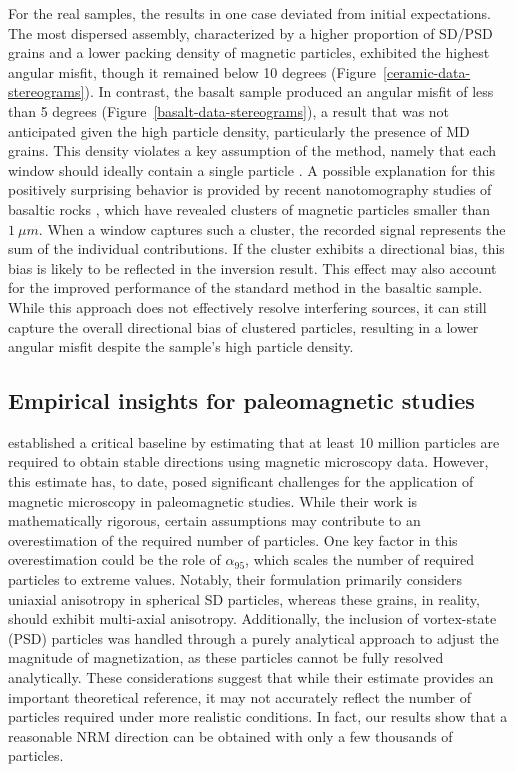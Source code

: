 For the real samples, the results in one case deviated from initial expectations. The most dispersed assembly, characterized by a higher proportion of SD/PSD grains and a lower packing density of magnetic particles, exhibited the highest angular misfit, though it remained below 10 degrees (Figure~\ref{ceramic-data-stereograms}). In contrast, the basalt sample produced an angular misfit of less than 5 degrees (Figure~\ref{basalt-data-stereograms}), a result that was not anticipated given the high particle density, particularly the presence of MD grains. This density violates a key assumption of the method, namely that each window should ideally contain a single particle \citep{Souza-Junior2024}. A possible explanation for this positively surprising behavior is provided by recent nanotomography studies of basaltic rocks \citep[\textit{e.g.}][]{Out2024, Out2025}, which have revealed clusters of magnetic particles smaller than \(1~\mu m\). When a window captures such a cluster, the recorded signal represents the sum of the individual contributions. If the cluster exhibits a directional bias, this bias is likely to be reflected in the inversion result. This effect may also account for the improved performance of the standard method in the basaltic sample. While this approach does not effectively resolve interfering sources, it can still capture the overall directional bias of clustered particles, resulting in a lower angular misfit despite the sample’s high particle density.


\subsection{Empirical insights for paleomagnetic studies}

\citet{Berndt2016} established a critical baseline by estimating that at least 10 million particles are required to obtain stable directions using magnetic microscopy data. However, this estimate has, to date, posed significant challenges for the application of magnetic microscopy in paleomagnetic studies. While their work is mathematically rigorous, certain assumptions may contribute to an overestimation of the required number of particles. One key factor in this overestimation could be the role of \textit{$\alpha_{95}$}, which scales the number of required particles to extreme values. Notably, their formulation primarily considers uniaxial anisotropy in spherical SD particles, whereas these grains, in reality, should exhibit multi-axial anisotropy. Additionally, the inclusion of vortex-state (PSD) particles was handled through a purely analytical approach to adjust the magnitude of magnetization, as these particles cannot be fully resolved analytically. These considerations suggest that while their estimate provides an important theoretical reference, it may not accurately reflect the number of particles required under more realistic conditions.
In fact, our results show that a reasonable NRM direction can be obtained with only a few thousands of particles. 


